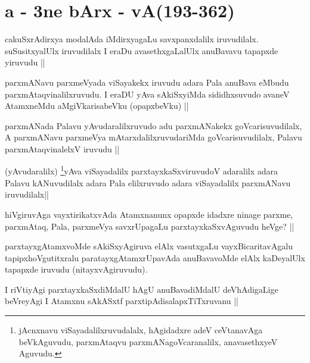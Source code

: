 \section*{a - 3ne bArx - vA(193-362)}
\begin{artha}
cakuSxrAdirxya modalAda iMdirxyagaLu savxpanxdalilx iruvudilalx. suSusitxyalUlx iruvudilalx I eraDu avasethxgaLalUlx anuBavavu tapapxde yiruvudu ||
\end{artha}

\begin{artha}
parxmANavu parxmeVyada viSayakekx iruvudu adara Pala anuBava eMbudu parxmAtaqvinalilxruvudu. I eraDU yAva sAkiSxyiMda sididhxsuvudo avaneV AtamxneMdu aMgiVkarisabeVku (opapxbeVku) ||
\end{artha}

\begin{artha}
parxmANada Palavu yAvudaralilxruvudo adu parxmANakekx goVcarisuvudilalx, A parxmANavu parxmeVya mAtarxdalilxruvudariMda goVcarisuvudilalx, Palavu parxmAtaqvinalelxV iruvudu ||
\end{artha}

\begin{artha}
(yAvudaralilx) \footnote{jAcnxnavu viSayadalilxruvudalalx, hAgidadxre adeV ceVtanavAga beVkAguvudu, parxmAtaqvu parxmANagoVcaranalilx, anavasethxyeV Aguvudu.}yAva viSayadalilx parxtayxkaSxviruvudoV adaralilx adara Palavu kANuvudilalx adara Pala elilxruvudo adara viSayadalilx parxmANavu iruvudilalx||
\end{artha}

\begin{artha}
hiVgiruvAga vayxtirikatxvAda Atamxnanunx opapxde idadxre ninage parxme, parxmAtaq, Pala, parxmeVya savxrUpagaLu parxtayxkaSxvAguvudu heVge? ||
\end{artha}

\begin{artha}
parxtayxgAtamxvoMde sAkiSxyAgiruva elAlx vasutxgaLu vayxBicaritavAgalu tapipxhoVgutitxralu paratayxgAtamxrUpavAda anuBavavoMde elAlx kaDeyalUlx tapapxde iruvudu (nitayxvAgiruvudu).
\end{artha}

\begin{artha}
I riVtiyAgi parxtayxkaSxdiMdalU hAgU anuBavadiMdalU deVhAdigaLige beVreyAgi I Atamxnu sAkASxtf parxtipAdisalapxTiTxruvanu ||
\end{artha}

